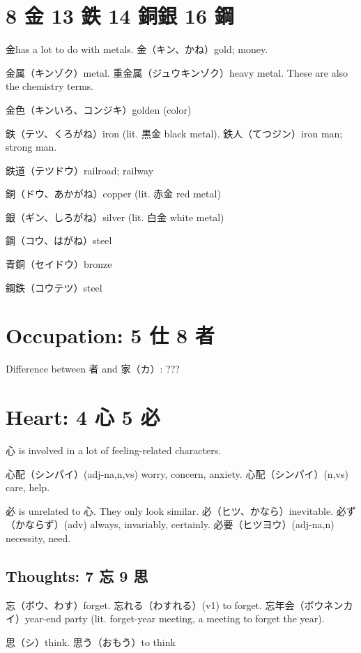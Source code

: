 \section{8 金 13 鉄 14 銅銀 16 鋼}

金has a lot to do with metals.
金（キン、かね）gold; money.

金属（キンゾク）metal.
重金属（ジュウキンゾク）heavy metal.
These are also the chemistry terms.

金色（キンいろ、コンジキ）golden (color)

鉄（テツ、くろがね）iron (lit. 黒金 black metal).
鉄人（てつジン）iron man; strong man.

鉄道（テツドウ）railroad; railway

銅（ドウ、あかがね）copper (lit. 赤金 red metal)

銀（ギン、しろがね）silver (lit. 白金 white metal)

鋼（コウ、はがね）steel

青銅（セイドウ）bronze

鋼鉄（コウテツ）steel

\section{Occupation: 5 仕 8 者}

Difference between 者 and 家（カ）: ???

\section{Heart: 4 心 5 必}

心 is involved in a lot of feeling-related characters.

心配（シンパイ）(adj-na,n,vs) worry, concern, anxiety.
心配（シンパイ）(n,vs) care, help.

必 is unrelated to 心. They only look similar.
必（ヒツ、かなら）inevitable.
必ず（かならず）(adv) always, invariably, certainly.
必要（ヒツヨウ）(adj-na,n) necessity, need.

\subsection{Thoughts: 7 忘 9 思}

忘（ボウ、わす）forget.
忘れる（わすれる）(v1) to forget.
忘年会（ボウネンカイ）year-end party
(lit. forget-year meeting, a meeting to forget the year).

思（シ）think.
思う（おもう）to think

